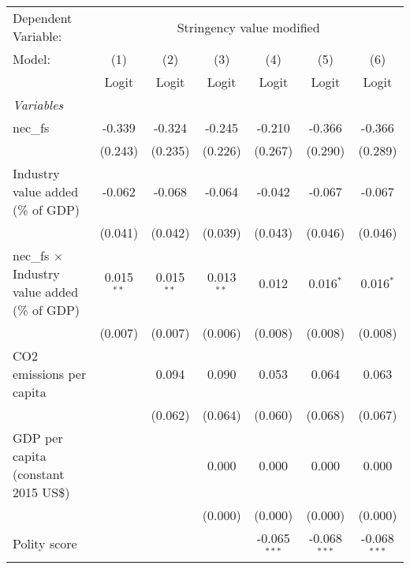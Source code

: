 
\begingroup
\centering
\begin{tabular}{lcccccc}
   \toprule
   Dependent Variable: & \multicolumn{6}{c}{Stringency value modified}\\
   Model:                                               & (1)          & (2)          & (3)          & (4)            & (5)            & (6)\\  
                                                        &  Logit       & Logit        & Logit        & Logit          & Logit          & Logit\\  
   \midrule
   \emph{Variables}\\
   nec\_fs                                              & -0.339       & -0.324       & -0.245       & -0.210         & -0.366         & -0.366\\   
                                                        & (0.243)      & (0.235)      & (0.226)      & (0.267)        & (0.290)        & (0.289)\\   
   Industry value added (\% of GDP)                     & -0.062       & -0.068       & -0.064       & -0.042         & -0.067         & -0.067\\   
                                                        & (0.041)      & (0.042)      & (0.039)      & (0.043)        & (0.046)        & (0.046)\\   
   nec\_fs $\times$ Industry value added (\% of GDP)    & 0.015$^{**}$ & 0.015$^{**}$ & 0.013$^{**}$ & 0.012          & 0.016$^{*}$    & 0.016$^{*}$\\   
                                                        & (0.007)      & (0.007)      & (0.006)      & (0.008)        & (0.008)        & (0.008)\\   
   CO2 emissions per capita                             &              & 0.094        & 0.090        & 0.053          & 0.064          & 0.063\\   
                                                        &              & (0.062)      & (0.064)      & (0.060)        & (0.068)        & (0.067)\\   
   GDP per capita (constant 2015 US\$)                  &              &              & 0.000        & 0.000          & 0.000          & 0.000\\   
                                                        &              &              & (0.000)      & (0.000)        & (0.000)        & (0.000)\\   
   Polity score                                         &              &              &              & -0.065$^{***}$ & -0.068$^{***}$ & -0.068$^{***}$\\   

\end{tabular}
